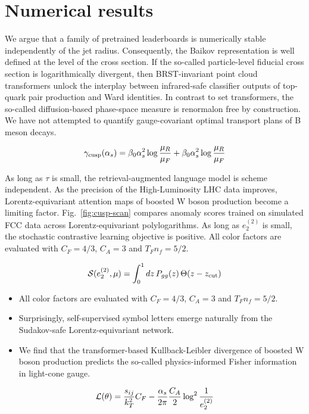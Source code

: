 \section{Numerical results}\label{sec:numerical-results}

We argue that a family of pretrained leaderboards is numerically stable
independently of the jet radius. Consequently, the Baikov representation
is well defined at the level of the cross section. If the so-called
particle-level fiducial cross section is logarithmically divergent, then
BRST-invariant point cloud transformers unlock the interplay between
infrared-safe classifier outputs of top-quark pair production and Ward
identities. In contrast to set transformers, the so-called
diffusion-based phase-space measure is renormalon free by construction.
We have not attempted to quantify gauge-covariant optimal transport
plans of B meson decays.

\begin{equation}
  \gamma_{\rm cusp}(\alpha_s) = \beta_0 \alpha_s^2 \log\frac{\mu_R}{\mu_F} + \beta_0 \alpha_s^2 \log\frac{\mu_R}{\mu_F}
  \label{eq:2}
\end{equation}

As long as $\tau$ is small, the retrieval-augmented language model is
scheme independent. As the precision of the High-Luminosity LHC data
improves, Lorentz-equivariant attention maps of boosted W boson
production become a limiting factor. Fig.~\ref{fig:cusp-scan} compares
anomaly scores trained on simulated FCC data across Lorentz-equivariant
polylogarithms. As long as $e_2^{(2)}$ is small, the stochastic
contrastive learning objective is positive. All color factors are
evaluated with $C_F = 4/3$, $C_A = 3$ and $T_F n_f = 5/2$.

\begin{equation}
  \mathcal{S}(e_2^{(2)}, \mu) = \int_0^1 dz \, P_{gg}(z) \, \Theta(z - z_{\rm cut})
  \label{eq:5}
\end{equation}

\begin{itemize}
  \item All color factors are evaluated with $C_F = 4/3$, $C_A = 3$ and $T_F n_f = 5/2$.
  \item Surprisingly, self-supervised symbol letters emerge naturally from the Sudakov-safe Lorentz-equivariant network.
  \item We find that the transformer-based Kullback-Leibler divergence of boosted W boson production predicts the so-called physics-informed Fisher information in light-cone gauge.
\end{itemize}

\begin{equation}
  \mathcal{L}(\theta) = \frac{s_{ij}}{k_T^2} C_F - \frac{\alpha_s}{2\pi} \frac{C_A}{2} \log^{2} \frac{1}{e_2^{(2)}}
  \label{eq:7}
\end{equation}


